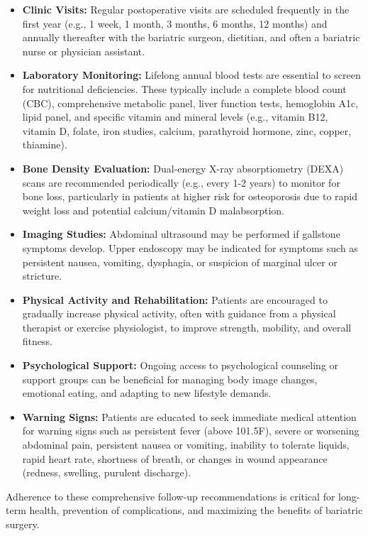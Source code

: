 \begin{itemize}
  \item \textbf{Clinic Visits:} Regular postoperative visits are scheduled frequently in the first year (e.g., 1 week, 1 month, 3 months, 6 months, 12 months) and annually thereafter with the bariatric surgeon, dietitian, and often a bariatric nurse or physician assistant.
  \item \textbf{Laboratory Monitoring:} Lifelong annual blood tests are essential to screen for nutritional deficiencies. These typically include a complete blood count (CBC), comprehensive metabolic panel, liver function tests, hemoglobin A1c, lipid panel, and specific vitamin and mineral levels (e.g., vitamin B12, vitamin D, folate, iron studies, calcium, parathyroid hormone, zinc, copper, thiamine).
  \item \textbf{Bone Density Evaluation:} Dual-energy X-ray absorptiometry (DEXA) scans are recommended periodically (e.g., every 1-2 years) to monitor for bone loss, particularly in patients at higher risk for osteoporosis due to rapid weight loss and potential calcium/vitamin D malabsorption.
  \item \textbf{Imaging Studies:} Abdominal ultrasound may be performed if gallstone symptoms develop. Upper endoscopy may be indicated for symptoms such as persistent nausea, vomiting, dysphagia, or suspicion of marginal ulcer or stricture.
  \item \textbf{Physical Activity and Rehabilitation:} Patients are encouraged to gradually increase physical activity, often with guidance from a physical therapist or exercise physiologist, to improve strength, mobility, and overall fitness.
  \item \textbf{Psychological Support:} Ongoing access to psychological counseling or support groups can be beneficial for managing body image changes, emotional eating, and adapting to new lifestyle demands.
  \item \textbf{Warning Signs:} Patients are educated to seek immediate medical attention for warning signs such as persistent fever (above 101.5\textdegree F), severe or worsening abdominal pain, persistent nausea or vomiting, inability to tolerate liquids, rapid heart rate, shortness of breath, or changes in wound appearance (redness, swelling, purulent discharge).
\end{itemize}

Adherence to these comprehensive follow-up recommendations is critical for long-term health, prevention of complications, and maximizing the benefits of bariatric surgery.

